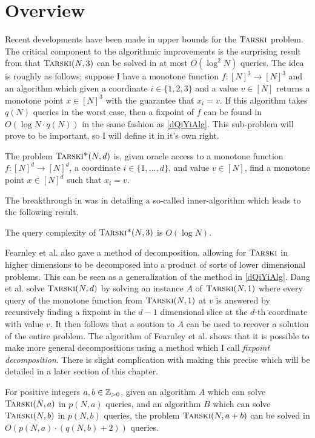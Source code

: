 \section{Overview}
Recent developments have been made in upper bounds for the $\textsc{Tarski}$ problem.
The critical component to the algorithmic improvements is
the surprising result from \citep{fasterTarski} that $\textsc{Tarski}(N, 3)$
can be solved in at most $O(\log^2 N)$ queries.
The idea is roughly as follows; suppose I have
a monotone function $f : [N]^3 \to [N]^3$ and an algorithm which
given a coordinate $i \in \{1, 2, 3\}$ and a value $v \in [N]$
returns a monotone point $x \in [N]^3$ with the guarantee
that $x_i = v$. If this algorithm takes $q(N)$ queries in the worst case,
then a fixpoint of $f$ can be found in $O(\log N \cdot q(N))$ in the
same fashion as \cref{dQiYiAlg}. This sub-problem will prove to be
important, so I will define it in it's own right.
\newcommand{\trsks}{\textsc{Tarski*}}
\begin{definition}[\trsks]
  The problem $\trsks(N, d)$ is, given oracle access to a monotone function $f : [N]^d \to [N]^d$,
  a coordinate $i \in \{1, ..., d\}$, and value $v \in [N]$, find a monotone point $x \in [N]^d$ such that
  $x_i = v$. 
\end{definition}
The breakthrough in \citep{fasterTarski} was in detailing a so-called inner-algorithm which leads to
the following result.
\begin{theorem}
  The query complexity of $\trsks(N, 3)$ is $O(\log N)$.
\end{theorem}
Fearnley et al. also gave a method of decomposition, allowing for $\textsc{Tarski}$ in higher
dimensions to be decomposed into a product of sorts of lower
dimensional problems. This can be seen as a generalization of the method in \cref{dQiYiAlg}.
Dang et al. solve $\textsc{Tarski}(N, d)$ by solving an instance $A$ of $\textsc{Tarski}(N, 1)$ 
where every query of the monotone function from $\textsc{Tarski}(N, 1)$ at $v$ is answered by recursively finding
a fixpoint in the $d-1$ dimensional slice at the $d$-th coordinate with value $v$. It then follows that
a soution to $A$ can be used to recover a solution of the entire problem. The algorithm of
Fearnley et al. shows that it is possible to make more general decompositions using a method
which I call \emph{fixpoint decomposition}. There is slight complication with making this precise
which will be detailed in a later section of this chapter.
\begin{theorem}\label{fixDecomp}
  For positive integers $a, b \in \mathbb{Z}_{> 0}$, given an algorithm $A$
  which can solve $\textsc{Tarski}(N, a)$ in $p(N, a)$ queries, and an algorithm $B$
  which can solve $\textsc{Tarski}(N, b)$ in $p(N, b)$ queries, the problem
  $\textsc{Tarski}(N, a + b)$ can be solved in $O(p(N, a)\cdot (q(N, b) + 2))$ queries.
\end{theorem}
